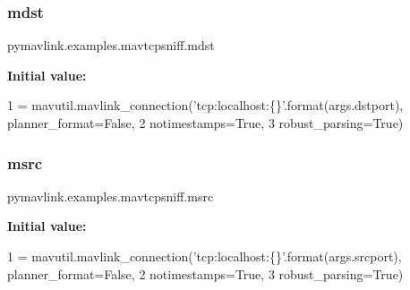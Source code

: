 \subsubsection{\texorpdfstring{mdst}{mdst}}
{\footnotesize\ttfamily pymavlink.\+examples.\+mavtcpsniff.\+mdst}

{\bfseries Initial value\+:}
\begin{DoxyCode}
1 =  mavutil.mavlink\_connection(\textcolor{stringliteral}{'tcp:localhost:\{\}'}.format(args.dstport), planner\_format=\textcolor{keyword}{False},
2                                   notimestamps=\textcolor{keyword}{True},
3                                   robust\_parsing=\textcolor{keyword}{True})
\end{DoxyCode}
\mbox{\label{namespacepymavlink_1_1examples_1_1mavtcpsniff_ac9d50620364a4c08daadfe49a1acbb0d}} 
\subsubsection{\texorpdfstring{msrc}{msrc}}
{\footnotesize\ttfamily pymavlink.\+examples.\+mavtcpsniff.\+msrc}

{\bfseries Initial value\+:}
\begin{DoxyCode}
1 =  mavutil.mavlink\_connection(\textcolor{stringliteral}{'tcp:localhost:\{\}'}.format(args.srcport), planner\_format=\textcolor{keyword}{False},
2                                   notimestamps=\textcolor{keyword}{True},
3                                   robust\_parsing=\textcolor{keyword}{True})
\end{DoxyCode}
